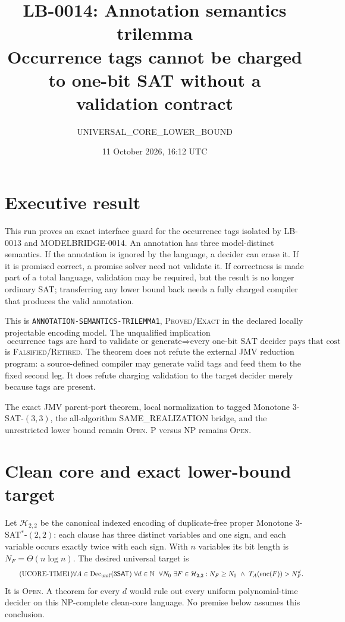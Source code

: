 \documentclass[11pt]{article}
\title{LB-0014: Annotation semantics trilemma\\Occurrence tags cannot be charged to one-bit SAT without a validation contract}
\author{UNIVERSAL\_CORE\_LOWER\_BOUND}
\date{11 October 2026, 16:12 UTC}
\newcommand{\status}[1]{\textsc{#1}}
\newcommand{\SAT}{\mathsf{SAT}}
\newcommand{\enc}{\operatorname{enc}}
\begin{document}
\maketitle

\section*{Executive result}

This run proves an exact interface guard for the occurrence tags isolated by
LB-0013 and MODELBRIDGE-0014.  An annotation has three model-distinct
semantics.  If the annotation is ignored by the language, a decider can erase
it.  If it is promised correct, a promise solver need not validate it.  If
correctness is made part of a total language, validation may be required, but
the result is no longer ordinary SAT; transferring any lower bound back needs
a fully charged compiler that produces the valid annotation.

This is \texttt{ANNOTATION-SEMANTICS-TRILEMMA1},
\status{Proved/Exact} in the declared locally projectable encoding model.
The unqualified implication
\[
 \tag{TAG-VALIDATION-TO-UCORE1}
 \text{occurrence tags are hard to validate or generate}
 \Longrightarrow
 \text{every one-bit SAT decider pays that cost}
\]
is \status{Falsified/Retired}.  The theorem does not refute the external JMV
reduction program: a source-defined compiler may generate valid tags and feed
them to the fixed second leg.  It does refute charging validation to the
target decider merely because tags are present.

The exact JMV parent-port theorem, local normalization to tagged Monotone
$3$-SAT-$(3,3)$, the all-algorithm SAME\_REALIZATION bridge, and the
unrestricted lower bound remain \status{Open}.  P versus NP remains
\status{Open}.

\section{Clean core and exact lower-bound target}

Let $\mathcal H_{2,2}$ be the canonical indexed encoding of duplicate-free
proper Monotone $3$-SAT$^*$-$(2,2)$: each clause has three distinct variables
and one sign, and each variable occurs exactly twice with each sign.  With
$n$ variables its bit length is $N_F=\Theta(n\log n)$.  The desired universal
target is
\[
 \tag{UCORE-TIME1}
 \forall A\in\mathrm{Dec}_{\rm unif}(3\SAT)\ \forall d\in\mathbb N\
 \ \forall N_0\ \exists F\in\mathcal H_{2,2}:
 N_F\ge N_0\ \wedge\ T_A(\enc(F))>N_F^d.
\]
It is \status{Open}.  A theorem for every $d$ would rule out every uniform
polynomial-time decider on this NP-complete clean-core language.  No premise
below assumes this conclusion.
\end{document}
